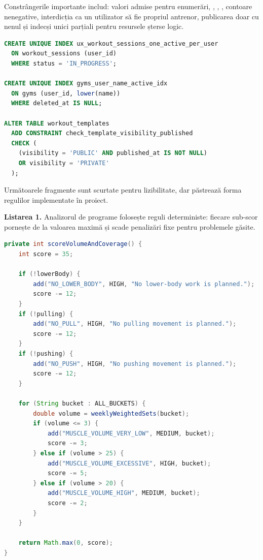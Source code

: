 Constrângerile importante includ: valori admise pentru enumerări, ,
, , contoare nenegative, interdicția
ca un utilizator să fie propriul antrenor, publicarea doar cu  nenul și indecși
unici parțiali pentru resursele șterse logic.

\begin{lstlisting}[language=SQL]
CREATE UNIQUE INDEX ux_workout_sessions_one_active_per_user
  ON workout_sessions (user_id)
  WHERE status = 'IN_PROGRESS';

CREATE UNIQUE INDEX gyms_user_name_active_idx
  ON gyms (user_id, lower(name))
  WHERE deleted_at IS NULL;

ALTER TABLE workout_templates
  ADD CONSTRAINT check_template_visibility_published
  CHECK (
    (visibility = 'PUBLIC' AND published_at IS NOT NULL)
    OR visibility = 'PRIVATE'
  );
\end{lstlisting}


Următoarele fragmente sunt scurtate pentru lizibilitate, dar păstrează forma regulilor implementate în
proiect.

\noindent\textbf{Listarea 1.} Analizorul de programe folosește reguli deterministe: fiecare sub-scor
pornește de la valoarea maximă și scade penalizări fixe pentru problemele găsite.

\begin{lstlisting}[language=Java]
private int scoreVolumeAndCoverage() {
    int score = 35;

    if (!lowerBody) {
        add("NO_LOWER_BODY", HIGH, "No lower-body work is planned.");
        score -= 12;
    }
    if (!pulling) {
        add("NO_PULL", HIGH, "No pulling movement is planned.");
        score -= 12;
    }
    if (!pushing) {
        add("NO_PUSH", HIGH, "No pushing movement is planned.");
        score -= 12;
    }

    for (String bucket : ALL_BUCKETS) {
        double volume = weeklyWeightedSets(bucket);
        if (volume <= 3) {
            add("MUSCLE_VOLUME_VERY_LOW", MEDIUM, bucket);
            score -= 3;
        } else if (volume > 25) {
            add("MUSCLE_VOLUME_EXCESSIVE", HIGH, bucket);
            score -= 5;
        } else if (volume > 20) {
            add("MUSCLE_VOLUME_HIGH", MEDIUM, bucket);
            score -= 2;
        }
    }

    return Math.max(0, score);
}
\end{lstlisting}

